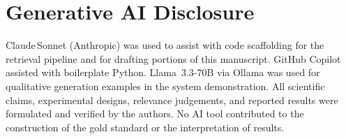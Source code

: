 \documentclass{iosart2x}
\begin{document}
\section{Generative AI Disclosure}
\label{sec:ai-disclosure}

Claude\,Sonnet (Anthropic) was used to assist with code scaffolding
for the retrieval pipeline and for drafting portions of this manuscript.
GitHub Copilot assisted with boilerplate Python.  Llama~3.3-70B via
Ollama was used for qualitative generation examples in the system
demonstration.  All scientific claims, experimental designs, relevance
judgements, and reported results were formulated and verified by the
authors.  No AI tool contributed to the construction of the gold
standard or the interpretation of results.




\end{document}
